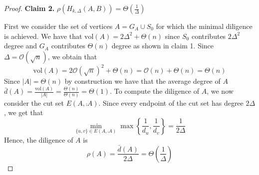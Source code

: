 \begin{proof}

	\textbf{Claim 2.} $\rho(H_{k, \Delta}(A,B)) = \Theta\left(\frac{1}{\Delta}\right)$

	First we consider the set of vertices $A = G_A \cup S_0$ for which the minimal diligence is achieved. %
	We have that $\text{vol}(A) = 2\Delta^2 + \Theta(n)$ since $S_0$ contributes $2\Delta^2$ degree and $G_A$ contributes $\Theta(n)$ degree as shown in claim 1. Since $\Delta = \mathcal{O}(\sqrt{n})$, we obtain that 
	$$
		\text{vol}(A) = 2 \mathcal{O}(\sqrt{n})^2 + \Theta(n) = \mathcal{O}(n) + \Theta(n) = \Theta(n)
	$$ %
	Since $|A| = \Theta(n)$ by construction we have that the average degree of $A$ $\bar{d}(A) = \frac{\text{vol}(A)}{|A|} = \frac{\Theta(n)}{\Theta(n)} = \Theta(1)$. To compute the diligence of $A$, we now consider the cut set $E(A, \comp{A})$. Since every endpoint of the cut set has degree $2\Delta$, we get that 
	$$
		\min_{\{u, v\} \in E(A, \comp{A})} \max \left\{ \frac{1}{d_u}, \frac{1}{d_v} \right\} = \frac{1}{2\Delta}
	$$
	Hence, the diligence of $A$ is 
	$$
		\rho(A) = \frac{\bar{d}(A)}{2\Delta} = \Theta\left(\frac{1}{\Delta}\right)
	$$ 

\end{proof}